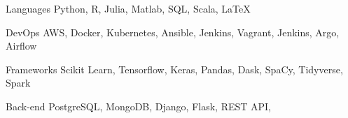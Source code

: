 

\begin{cvskills}

  \cvskill
    {Languages} %
    {Python, R, Julia, Matlab, SQL, Scala, LaTeX} %

  \cvskill
    {DevOps} %
    {AWS, Docker, Kubernetes, Ansible, Jenkins, Vagrant, Jenkins, Argo, Airflow} %

  \cvskill
    {Frameworks} %
    {Scikit Learn, Tensorflow, Keras, Pandas, Dask, SpaCy, Tidyverse, Spark} %

  \cvskill
    {Back-end} %
    {PostgreSQL, MongoDB, Django, Flask, REST API, } %

\end{cvskills}
